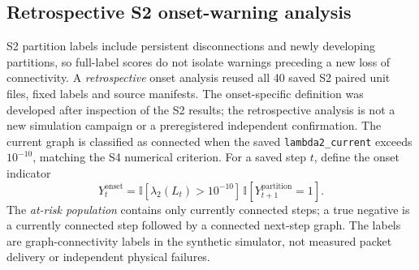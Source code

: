 \documentclass[preprint,12pt]{elsarticle}
\theoremstyle{definition}\newtheorem{definition}{Definition}
\theoremstyle{plain}\newtheorem{theorem}{Theorem}
\theoremstyle{plain}\newtheorem{lemma}{Lemma}
\theoremstyle{plain}\newtheorem{corollary}{Corollary}
\theoremstyle{plain}\newtheorem{assumption}{Assumption}
\theoremstyle{remark}\newtheorem{remark}[theorem]{Remark}
\begin{document}



\subsection{Retrospective S2 onset-warning analysis}\label{subsec:s2_onset}
S2 partition labels include persistent disconnections and newly developing partitions, so full-label scores do not isolate warnings preceding a new loss of connectivity. A \emph{retrospective} onset analysis reused all 40 saved S2 paired unit files, fixed labels and source manifests. The onset-specific definition was developed after inspection of the S2 results; the retrospective analysis is not a new simulation campaign or a preregistered independent confirmation. The current graph is classified as connected when the saved \texttt{lambda2\_current} exceeds $10^{-10}$, matching the S4 numerical criterion. For a saved step $t$, define the onset indicator
\begin{equation}
 Y_t^{\mathrm{onset}}=\mathbb{I}[\lambda_2(L_t)>10^{-10}]\,\mathbb{I}[Y_{t+1}^{\mathrm{partition}}=1].
\label{eq:onset}
\end{equation}
The \emph{at-risk population} contains only currently connected steps; a true negative is a currently connected step followed by a connected next-step graph. The labels are graph-connectivity labels in the synthetic simulator, not measured packet delivery or independent physical failures.
\end{document}
